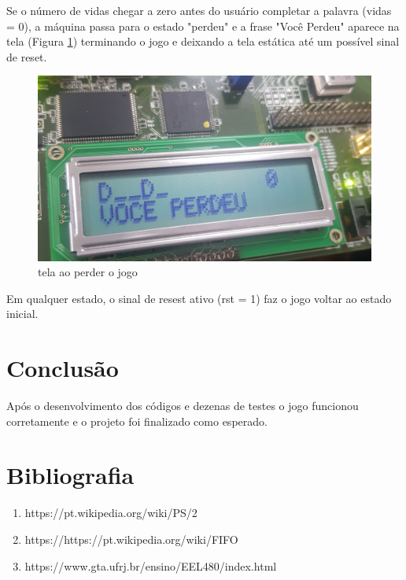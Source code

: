 \documentclass[a4paper,12pt,twoside]{article}
\begin{document}
 Se o número de vidas chegar a zero antes do usuário completar a palavra (vidas = 0), a máquina passa para o estado "perdeu" e a frase "Você Perdeu" aparece na tela (Figura \ref{fig:perdeu}) terminando o jogo e deixando a tela estática até um possível sinal de reset.
\begin{figure}[H]
\centering
\includegraphics[scale=0.1]{perdeu.jpg}
\caption{tela ao perder o jogo}
\label{fig:perdeu}
\end{figure}

Em  qualquer estado, o sinal de resest ativo (rst = 1) faz o jogo voltar ao estado inicial.

\section{Conclusão}
    Após o desenvolvimento dos códigos e dezenas de testes o jogo funcionou corretamente e o projeto foi finalizado como esperado.
\section{Bibliografia}
\begin{enumerate}
    \item https://pt.wikipedia.org/wiki/PS/2
    \item https://https://pt.wikipedia.org/wiki/FIFO
   \item https://www.gta.ufrj.br/ensino/EEL480/index.html

 \end{enumerate}
\end{document}
